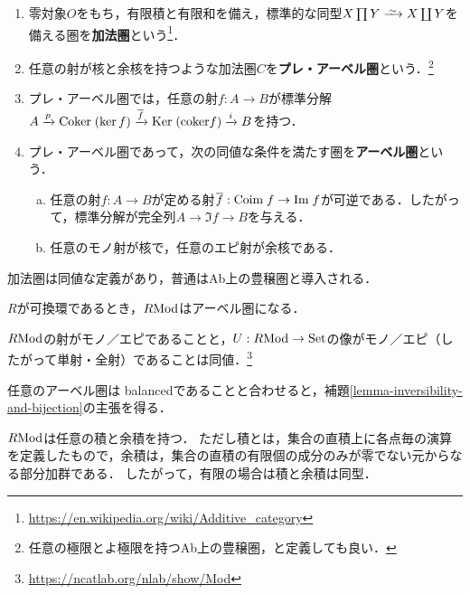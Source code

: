 \documentclass[uplatex,dvipdfmx]{jsreport}
\begin{document}
\begin{definition}\mbox{}
    \begin{enumerate}
        \item 零対象$O$をもち，有限積と有限和を備え，標準的な同型$X\prod Y\iso X\coprod Y$を備える圏を\textbf{加法圏}という\footnote{\url{https://en.wikipedia.org/wiki/Additive_category}}．
        \item 任意の射が核と余核を持つような加法圏$C$を\textbf{プレ・アーベル圏}という．\footnote{任意の極限とよ極限を持つAb上の豊穣圏，と定義しても良い．}
        \item プレ・アーベル圏では，任意の射$f:A\to B$が標準分解$A\xrightarrow{p}\mathrm{Coker}\;(\ker f)\xrightarrow{\overline{f}}\mathrm{Ker}\;(\mathrm{coker} f)\xrightarrow{i}B$を持つ．
        \item プレ・アーベル圏であって，次の同値な条件を満たす圏を\textbf{アーベル圏}という．
        \begin{enumerate}[(a)]
            \item 任意の射$f:A\to B$が定める射$\overline{f}:\mathrm{Coim}\; f\to\mathrm{Im}\; f$が可逆である．したがって，標準分解が完全列$A\to\Im f\to B$を与える．
            \item 任意のモノ射が核で，任意のエピ射が余核である．
        \end{enumerate}
    \end{enumerate}
\end{definition}
\begin{remark}
    加法圏は同値な定義があり，普通はAb上の豊穣圏と導入される．
\end{remark}

\begin{proposition}
    $R$が可換環であるとき，$R\mathrm{Mod}$はアーベル圏になる．
\end{proposition}

\begin{proposition}
    $R\mathrm{Mod}$の射がモノ／エピであることと，$U:R\mathrm{Mod}\to\mathrm{Set}$の像がモノ／エピ（したがって単射・全射）であることは同値．\footnote{\url{https://ncatlab.org/nlab/show/Mod}}
\end{proposition}
\begin{remark}
    任意のアーベル圏は
    balancedであることと合わせると，補題\ref{lemma-inversibility-and-bijection}の主張を得る．
\end{remark}

\begin{proposition}
    $R\mathrm{Mod}$は任意の積と余積を持つ．
    ただし積とは，集合の直積上に各点毎の演算を定義したもので，余積は，集合の直積の有限個の成分のみが零でない元からなる部分加群である．
    したがって，有限の場合は積と余積は同型．
\end{proposition}
\end{document}
